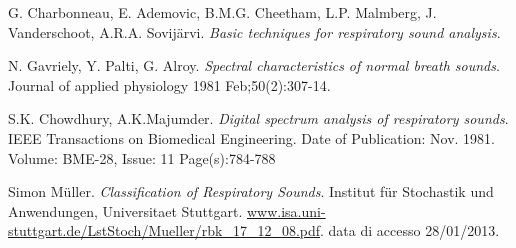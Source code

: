 \begin{thebibliography}{99}













  G. Charbonneau, E. Ademovic, B.M.G. Cheetham, L.P. Malmberg, J. Vanderschoot, A.R.A. Sovij\"{a}rvi.
  \emph{Basic techniques for respiratory sound analysis}.

  N. Gavriely, Y. Palti, G. Alroy.
  \emph{Spectral characteristics of normal breath sounds}.
  Journal of applied physiology  1981 Feb;50(2):307-14.

  S.K. Chowdhury, A.K.Majumder.
  \emph{Digital spectrum analysis of respiratory sounds}.
  IEEE Transactions on Biomedical Engineering. 
  Date of Publication: Nov. 1981. 
  Volume: BME-28, Issue: 11 
  Page(s):784-788 


  Simon M\"{u}ller.
  \emph{Classification of Respiratory Sounds}.
  Institut f\"{u}r Stochastik und Anwendungen, Universitaet Stuttgart.
  \url{www.isa.uni-stuttgart.de/LstStoch/Mueller/rbk_17_12_08.pdf}.
  data di accesso 28/01/2013.
  

\end{thebibliography}
